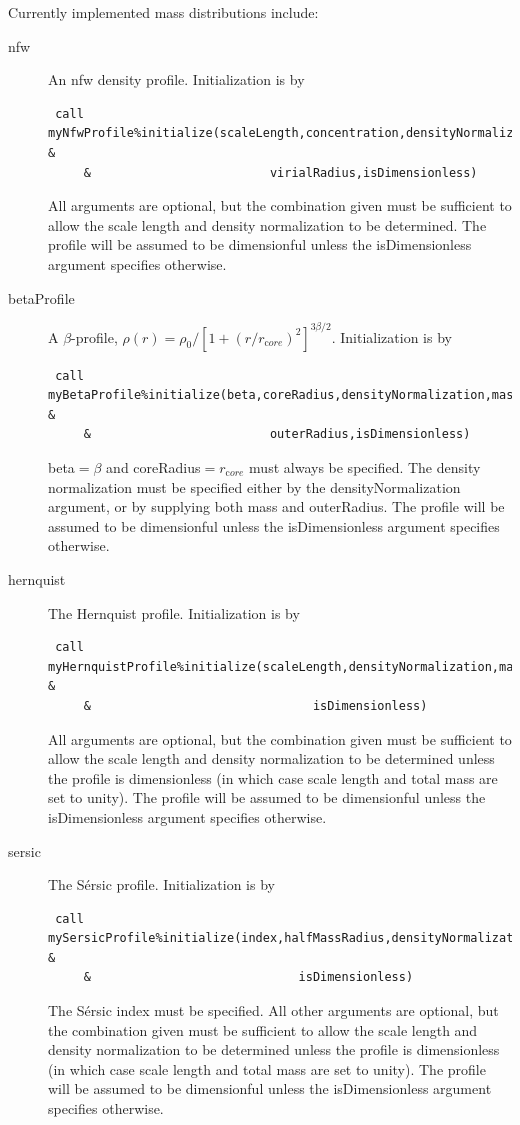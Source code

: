 Currently implemented mass distributions include:
\begin{description}
 \item [{\normalfont \ttfamily nfw}] An \gls{nfw} \citep{navarro_universal_1997} density profile. Initialization is by
\begin{verbatim}
 call myNfwProfile%initialize(scaleLength,concentration,densityNormalization,mass, &
     &                         virialRadius,isDimensionless)
\end{verbatim}
All arguments are optional, but the combination given must be sufficient to allow the scale length and density normalization to be determined. The profile will be assumed to be dimensionful unless the {\normalfont \ttfamily isDimensionless} argument specifies otherwise.
 \item [{\normalfont \ttfamily betaProfile}] A $\beta$-profile, $\rho(r)=\rho_0/[1+(r/r_{\mathrm core})^2]^{3\beta/2}$. Initialization is by
\begin{verbatim}
 call myBetaProfile%initialize(beta,coreRadius,densityNormalization,mass, &
     &                         outerRadius,isDimensionless)
\end{verbatim}
 {\normalfont \ttfamily beta}$=\beta$ and {\normalfont \ttfamily coreRadius}$=r_{\mathrm core}$ must always be specified. The density normalization must be specified either by the {\normalfont \ttfamily densityNormalization} argument, or by supplying both {\normalfont \ttfamily mass} and {\normalfont \ttfamily outerRadius}. The profile will be assumed to be dimensionful unless the {\normalfont \ttfamily isDimensionless} argument specifies otherwise.
 \item [{\normalfont \ttfamily hernquist}] The Hernquist \citep{hernquist_analytical_1990} profile. Initialization is by
\begin{verbatim}
 call myHernquistProfile%initialize(scaleLength,densityNormalization,mass, &
     &                               isDimensionless)
\end{verbatim}
All arguments are optional, but the combination given must be sufficient to allow the scale length and density normalization to be determined unless the profile is dimensionless (in which case scale length and total mass are set to unity). The profile will be assumed to be dimensionful unless the {\normalfont \ttfamily isDimensionless} argument specifies otherwise.
 \item [{\normalfont \ttfamily sersic}] The S\'ersic \citep{sersic_influence_1963} profile. Initialization is by
\begin{verbatim}
 call mySersicProfile%initialize(index,halfMassRadius,densityNormalization,mass, &
     &                             isDimensionless)
\end{verbatim}
The S\'ersic {\normalfont \ttfamily index} must be specified. All other arguments are optional, but the combination given must be sufficient to allow the scale length and density normalization to be determined unless the profile is dimensionless (in which case scale length and total mass are set to unity). The profile will be assumed to be dimensionful unless the {\normalfont \ttfamily isDimensionless} argument specifies otherwise.
\end{description}

